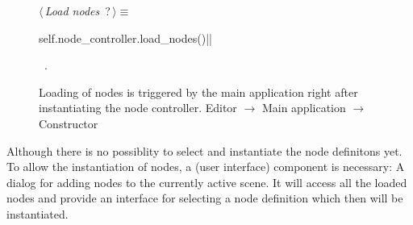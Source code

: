 \documentclass[%
    a4paper,    %
    justified,  %
    nobib,      %
    openany     %
]{tufte-book}
\makeatletter
\renewcommand{\label}[1]{\@tufte@label{##1}}%
\makeatother
\begin{document}
\begin{figure}
\begin{flushleft} \small
\begin{minipage}{\linewidth}\label{scrap147}\raggedright\small
{} $\langle\,${\itshape Load nodes}\nobreak\ {\footnotesize {?}}$\,\rangle\equiv$
\vspace{-1ex}
\begin{pythoncode}
self.node_controller.load_nodes()|\NWsep|
\end{pythoncode}
\vspace{1.5ex}
\footnotesize
\begin{list}{}{\setlength{\itemsep}{-\parsep}\setlength{\itemindent}{-\leftmargin}}
\item \NWtxtMacroRefIn\ .

\item{}
\end{list}
\end{minipage}\vspace{4ex}
\end{flushleft}
\caption{Loading of nodes is triggered by the main application right after
  instantiating the node controller.
  \newline{}\newline{}Editor $\rightarrow$ Main application $\rightarrow$
  Constructor}
\label{editor:lst:main-application:constructor:load-nodes}
\end{figure}

 Although there is
no possiblity to select and instantiate the node definitons yet. To allow the
instantiation of nodes, a (user interface) component is necessary: A dialog for
adding nodes to the currently active scene. It will access all the loaded nodes
and provide an interface for selecting a node definition which then will be
instantiated.
\end{document}
